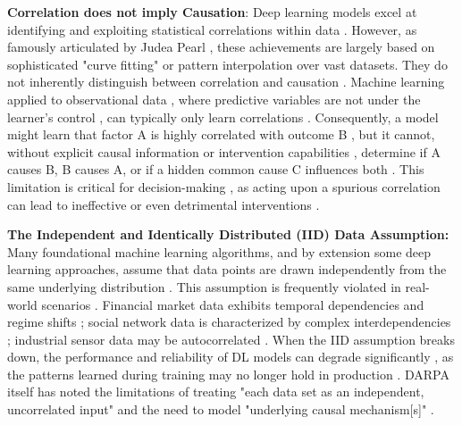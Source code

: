 \textbf{Correlation does not imply Causation}: Deep learning models excel at identifying and exploiting statistical correlations within data \cite{Scholkopf2021Toward, Kaddour2022Causal, Bareinboim2012causal, Guo2018Survey}. However, as famously articulated by Judea Pearl \cite{Pearl2009Causality}, these achievements are largely based on sophisticated "curve fitting" or pattern interpolation over vast datasets\cite{Pearl2009Causality, Bareinboim2020On, Scholkopf2021Toward}. They do not inherently distinguish between correlation and causation \cite{Pearl2009Causality, Bareinboim2012causal, Scholkopf2021Toward, Kaddour2022Causal, wolff2018solutions, Peters2017Elements, Guo2018Survey, Guyon2010Causality}. Machine learning applied to observational data \cite{Peters2017Elements}, where predictive variables are not under the learner's control \cite{Bareinboim2012causal}, can typically only learn correlations \cite{Bareinboim2012causal, Peters2017Elements}. Consequently, a model might learn that factor A is highly correlated with outcome B \cite{Bareinboim2012causal}, but it cannot, without explicit causal information or intervention capabilities \cite{Pearl2009Causality, Bareinboim2012causal, Scholkopf2021Toward, Kaddour2022Causal, Peters2017Elements, Lattimore2016Causal, Lee2018Structural}, determine if A causes B, B causes A, or if a hidden common cause C influences both \cite{Bareinboim2012causal, Peters2017Elements}. This limitation is critical for decision-making \cite{Bareinboim2012causal, Kaddour2022Causal, Wang2020Causal, Lu2020Regret, Aglietti2020Causal}, as acting upon a spurious correlation \cite{Bareinboim2012causal, Peters2017Elements, Lu2020Regret} can lead to ineffective or even detrimental interventions \cite{Bareinboim2012causal, Lu2020Regret}.

\textbf{The Independent and Identically Distributed (IID) Data Assumption:} Many foundational machine learning algorithms, and by extension some deep learning approaches, assume that data points are drawn independently from the same underlying distribution \cite{jordan2015machine}. 
This assumption is frequently violated in real-world scenarios \cite{Scholkopf2021Toward, Kohavi2009Controlled}. Financial market data exhibits temporal dependencies and regime shifts \cite{ Pena2016Multivariate}; social network data is characterized by complex interdependencies \cite{baykal2022bandit, Wang2020Causal}; industrial sensor data may be autocorrelated \cite{binkowski2017autoregressive, Li2020Enhanced, Runge2019Detecting}. When the IID assumption breaks down, the performance and reliability of DL models can degrade significantly \cite{Scholkopf2021Toward}, as the patterns learned during training may no longer hold in production \cite{Scholkopf2021Toward}. DARPA itself has noted the limitations of treating "each data set as an independent, uncorrelated input" and the need to model "underlying causal mechanism[s]" \cite{DARPA_ANSR}.

